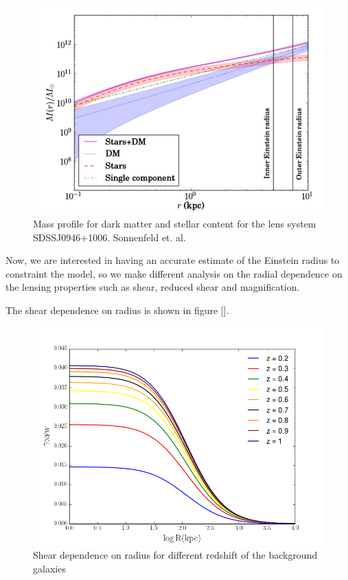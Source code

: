 \begin{figure}[H]
\centering
\includegraphics[width=12cm]{images/sonnenfeld_galaxy.png}
\caption[DM and Stellar mass profiles for a massive early type galaxy.]{Mass profile for dark matter and stellar content for the lens system SDSSJ0946+1006. Sonnenfeld et. al. \citeyear{Reference15}}
\end{figure}

Now, we are interested in having an accurate estimate of the Einstein radius to constraint the model, so we make different analysis on the radial dependence on the lensing properties such as shear, reduced shear and magnification.

The shear dependence on radius is shown in figure [].

\begin{figure}[H]
\centering
\includegraphics[width=12cm]{images/Shear_vs_rad.png}
\caption[Shear dependence on radius]{Shear dependence on radius for different redshift of the background galaxies}
\end{figure}


